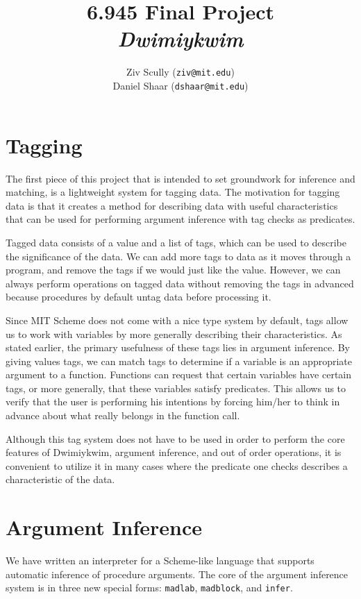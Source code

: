 \documentclass[11pt]{article}
\title{6.945 Final Project \\ \emph{Dwimiykwim}}
\author{Ziv Scully (\texttt{ziv@mit.edu}) \\
  Daniel Shaar (\texttt{dshaar@mit.edu})}
\date{}
\begin{document}
\maketitle


\section{Tagging}

The first piece of this project that is intended to set groundwork
for inference and matching, is a lightweight system for tagging data.
The motivation for tagging data is that it creates a method for
describing data with useful characteristics that can be used for
performing argument inference with tag checks as predicates.

Tagged data consists of a value and a list of tags,
which can be used to describe the significance of the data.
We can add more tags to data as it moves through a program,
and remove the tags if we would just like the value.
However, we can always perform operations on tagged data
without removing the tags in advanced because procedures by default
untag data before processing it.

Since MIT Scheme does not come with a nice type system by default,
tags allow us to work with variables
by more generally describing their characteristics.
As stated earlier, the primary usefulness of these tags
lies in argument inference.
By giving values tags, we can match tags to determine if a variable
is an appropriate argument to a function.
Functions can request that certain variables have certain tags,
or more generally, that these variables satisfy predicates.
This allows us to verify that the user is performing his intentions
by forcing him/her to think in advance about what really belongs
in the function call.

Although this tag system does not have to be used in order to perform
the core features of Dwimiykwim, argument inference,
and out of order operations, it is convenient to utilize it
in many cases where the predicate one checks describes a characteristic
of the data.


\section{Argument Inference}

We have written an interpreter for a Scheme-like language
that supports automatic inference of procedure arguments.
The core of the argument inference system is in three new special forms:
\texttt{madlab}, \texttt{madblock}, and \texttt{infer}.
\end{document}

